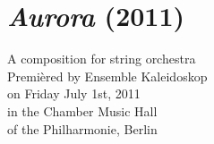 \chapter{\emph{Aurora} (2011)}

\begin{singlespacing}
\begin{flushright}
A composition for string orchestra \\
\vspace*{\baselineskip}
Premi\`{e}red by Ensemble Kaleidoskop \\
on Friday July 1st, 2011 \\
in the Chamber Music Hall \\
of the Philharmonie, Berlin
\end{flushright}
\end{singlespacing}

